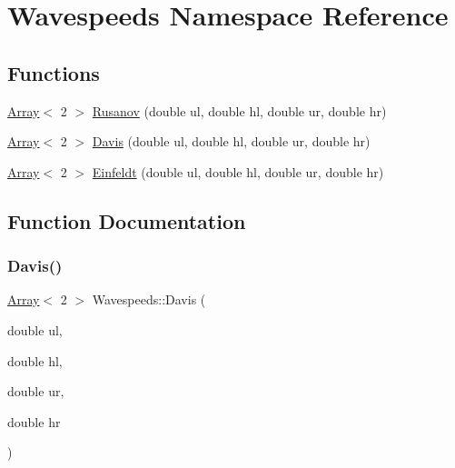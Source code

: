 \hypertarget{namespaceWavespeeds}{}\section{Wavespeeds Namespace Reference}
\label{namespaceWavespeeds}
\subsection*{Functions}
\begin{DoxyCompactItemize}
\item 
\hyperlink{Includes_8h_abd9de33944f934950000c3929e14ad8d}{Array}$<$ 2 $>$ \hyperlink{namespaceWavespeeds_a82f960a5ba11c39d153ed7d1fda72cee}{Rusanov} (double ul, double hl, double ur, double hr)
\item 
\hyperlink{Includes_8h_abd9de33944f934950000c3929e14ad8d}{Array}$<$ 2 $>$ \hyperlink{namespaceWavespeeds_aa32adcd643642d4081f86abe6aab72c5}{Davis} (double ul, double hl, double ur, double hr)
\item 
\hyperlink{Includes_8h_abd9de33944f934950000c3929e14ad8d}{Array}$<$ 2 $>$ \hyperlink{namespaceWavespeeds_a2615d8dd30bc5a6ef9ee4f4c788f1ed1}{Einfeldt} (double ul, double hl, double ur, double hr)
\end{DoxyCompactItemize}


\subsection{Function Documentation}
\mbox{\label{namespaceWavespeeds_aa32adcd643642d4081f86abe6aab72c5}} 
\subsubsection{\texorpdfstring{Davis()}{Davis()}}
{\footnotesize\ttfamily \hyperlink{Includes_8h_abd9de33944f934950000c3929e14ad8d}{Array}$<$ 2 $>$ Wavespeeds\+::\+Davis (\begin{DoxyParamCaption}\item[{double}]{ul,  }\item[{double}]{hl,  }\item[{double}]{ur,  }\item[{double}]{hr }\end{DoxyParamCaption})}

\mbox{\label{namespaceWavespeeds_a2615d8dd30bc5a6ef9ee4f4c788f1ed1}} 

